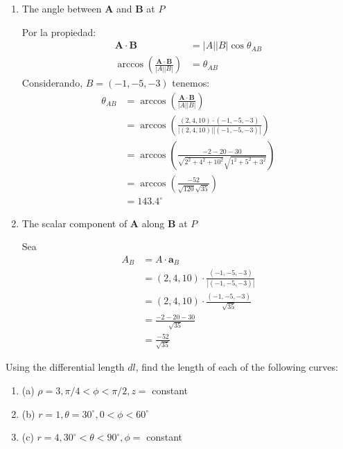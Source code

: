 \begin{problema}
\begin{enumerate}
        \item The angle between $\mathbf{A}$ and $\mathbf{B}$ at $P$
        \begin{sol}
            Por la propiedad: 
            \begin{align*}
                \mathbf{A}\cdot \mathbf{B} &= |A||B|\cos\theta_{AB}\\
                \arccos\left(\frac{\mathbf{A}\cdot \mathbf{B}}{|A||B|}\right) &=\theta_{AB}
            \end{align*}
            Considerando, $B=(-1,-5,-3)$ tenemos: 
            \begin{align*}
                \theta_{AB} &= \arccos\left(\frac{\mathbf{A}\cdot \mathbf{B}}{|A||B|}\right)\\
                &=\arccos\left(\frac{(2,4,10)\cdot (-1,-5,-3)}{|(2,4,10)||(-1,-5,-3)|}\right)\\
                &= \arccos\left(\frac{-2-20-30}{\sqrt{2^2+4^2+10^2}\sqrt{1^2+5^2+3^2}}\right)\\
                &= \arccos\left(\frac{-52}{\sqrt{120}\sqrt{35}}\right)\\
                &= 143.4^\circ 
            \end{align*}
        \end{sol}
        
        \item The scalar component of $\mathbf{A}$ along $\mathbf{B}$ at $P$
        \begin{sol}
            Sea 
            \begin{align*}
                A_B &= A\cdot \mathbf{a}_B\\
                 &= (2,4,10)\cdot\frac{(-1,-5,-3)}{|(-1,-5,-3)|}\\
                  &= (2,4,10)\cdot\frac{(-1,-5,-3)}{\sqrt{35}}\\
                  &= \frac{-2-20-30}{\sqrt{35}}\\
                  &= \frac{-52}{\sqrt{35}}
            \end{align*}
        \end{sol}
    \end{enumerate}

\end{problema}


\begin{problema}
    Using the differential length $d l$, find the length of each of the following curves:

    \begin{enumerate}
        \item (a) $\rho=3, \pi / 4<\phi<\pi / 2, z=$ constant

        \item (b) $r=1, \theta=30^{\circ}, 0<\phi<60^{\circ}$
        
        \item (c) $r=4,30^{\circ}<\theta<90^{\circ}, \phi=$ constant
    \end{enumerate}

        \end{problema}



